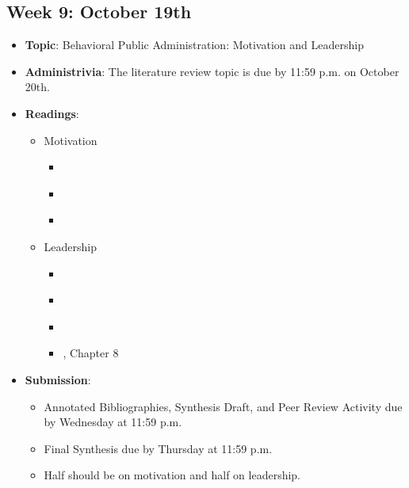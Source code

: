 \documentclass[12pt, letterpaper]{article}
\begin{document}
\subsection*{Week 9: October 19th}
    \begin{itemize}
        \item \textbf{Topic}: Behavioral Public Administration: Motivation and Leadership
        \item \textbf{Administrivia}: The literature review topic is due by 11:59 p.m. on October 20th.
        \item \textbf{Readings}:
            \begin{itemize}
                \item Motivation
                    \begin{itemize}
                        \item \cite{Herzberg2003}
                        \item \cite{Christensen2017}
                        \item \cite{Lachance2017}
                    \end{itemize}
                \item Leadership
                    \begin{itemize}
                        \item \cite{Fairholm2004}
                        \item \cite{Magee2014}
                        \item \cite{Paarlberg2010}
                        \item \cite{Denhardt2015}, Chapter 8
                    \end{itemize}
            \end{itemize}
        \item \textbf{Submission}: 
                \begin{itemize}
                    \item Annotated Bibliographies, Synthesis Draft, and Peer Review Activity due by Wednesday at 11:59 p.m. 
                    \item Final Synthesis due by Thursday at 11:59 p.m.
                    \item Half should be on motivation and half on leadership.
                \end{itemize} 
        \end{itemize}
\end{document}
